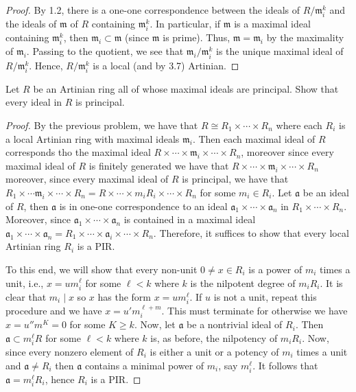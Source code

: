 \begin{proof}
By 1.2, there is a one-one correspondence between the ideals of
$R/\mathfrak{m}_i^k$ and the ideals of $\mathfrak{m}$ of $R$
containing $\mathfrak{m}_i^k$. In particular, if $\mathfrak{m}$
is a maximal ideal containing $\mathfrak{m}_i^k$, then
$\mathfrak{m}_i\subset\mathfrak{m}$ (since $\mathfrak{m}$ is
prime). Thus, $\mathfrak{m}=\mathfrak{m}_i$ by the maximality of
$\mathfrak{m}_i$. Passing to the quotient, we see that
$\mathfrak{m}_i/\mathfrak{m}_i^k$ is the unique maximal ideal of
$R/\mathfrak{m}_i^k$. Hence, $R/\mathfrak{m}_i^k$ is a local (and
by 3.7) Artinian.
\end{proof}
\newpage
\begin{problem}
Let $R$ be an Artinian ring all of whose maximal ideals are
principal. Show that every ideal in $R$ is principal.
\end{problem}
\begin{proof}

By the previous problem, we have that $R\cong
R_1\times\cdots\times R_n$ where each $R_i$ is a local Artinian
ring with maximal ideals $\mathfrak{m}_i$. Then each maximal
ideal of $R$ corresponds tho the maximal ideal
$R\times\cdots\times\mathfrak{m}_i\times\cdots\times R_n$,
moreover since every maximal ideal of $R$ is finitely generated
we have that $R\times\cdots\times\mathfrak{m}_i\times\cdots\times
R_n$ moreover, since every maximal ideal of $R$ is principal, we
have that $R_1\times\cdots\mathfrak{m}_i\times\cdots\times
R_n=R\times\cdots\times m_iR_i\times\cdots\times R_n$ for some
$m_i\in R_i$. Let $\mathfrak{a}$ be an ideal of $R$, then
$\mathfrak{a}$ is in one-one correspondence to an ideal
$\mathfrak{a}_1\times\cdots\times\mathfrak{a}_n$ in
$R_1\times\cdots\times R_n$. Moreover, since
$\mathfrak{a}_1\times\cdots\times\mathfrak{a}_n$ is contained in
a maximal ideal
$\mathfrak{a}_1\times\cdots\times\mathfrak{a}_n=R_1\times\cdots\times\mathfrak{a}_i\times\cdots\times
R_n$. Therefore, it suffices to show that every local Artinian
ring $R_i$ is a PIR.

To this end, we will show that every non-unit $0\neq x\in R_i$ is
a power of $m_i$ times a unit, i.e., $x=um_i^{\ell}$ for some
$\ell<k$ where $k$ is the nilpotent degree of $m_iR_i$. It is
clear that $m_i\mid x$ so $x$ has the form $x=um_i^\ell$. If $u$
is not a unit, repeat this procedure and we have
$x=u'm_i^{\ell+m}$. This must terminate for otherwise we have
$x=u''m^K=0$ for some $K\geq k$. Now, let $\mathfrak{a}$ be a
nontrivial ideal of $R_i$. Then $\mathfrak{a}\subset m_i^\ell R$
for some $\ell<k$ where $k$ is, as before, the nilpotency of
$m_iR_i$. Now, since every nonzero element of $R_i$ is either a
unit or a potency of $m_i$ times a unit and $\mathfrak{a}\neq
R_i$ then $\mathfrak{a}$ contains a minimal power of $m_i$, say
$m_i^\ell$. It follows that $\mathfrak{a}=m_i^\ell R_i$, hence
$R_i$ is a PIR.
\end{proof}
